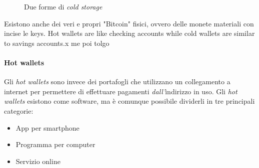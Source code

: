 \documentclass {article}
\begin{document}
\begin{figure}[htb!]

 
\caption{Due forme di \textit{cold storage}}

\end{figure}
\vspace {0.2cm}
\noindent
%
Esistono anche dei veri e propri "Bitcoin" fisici, ovvero delle monete materiali con incise le keys.
Hot wallets are like checking accounts while cold wallets are similar to savings accounts.x me poi tolgo

\paragraph {Hot wallets}

Gli \textit{hot wallets} sono invece dei portafogli che utilizzano un collegamento a internet per permettere di effettuare pagamenti \emph{dall'}indirizzo in uso.
Gli \textit{hot wallets} esistono come software, ma è comunque possibile dividerli in tre principali categorie:

\begin{itemize}
\item App per smartphone
\item Programma per computer
\item Servizio online
\end{itemize}
\end{document}
